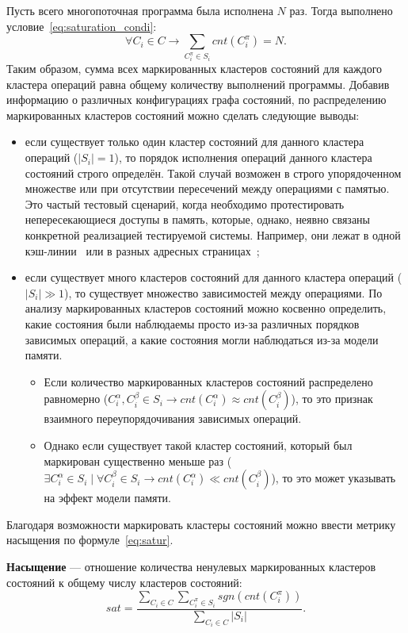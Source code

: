 Пусть всего многопоточная программа была исполнена $N$ раз. Тогда
выполнено условие~\ref{eq:saturation_condi}:
\begin{equation}
  \forall C_i \in C \rightarrow \sum_{C_i^\pi \in S_i}{cnt(C_i^\pi)} = N.
  \label{eq:saturation_condi}
\end{equation}
Таким образом, сумма всех маркированных кластеров состояний для
каждого кластера операций равна общему количеству выполнений
программы. Добавив информацию о различных конфигурациях графа
состояний, по распределению маркированных кластеров состояний можно
сделать следующие выводы:
\begin{itemize}
  \item если существует только один кластер состояний для данного
    кластера операций ($|S_i| = 1$), то порядок исполнения операций
    данного кластера состояний строго определён. Такой случай
    возможен в строго упорядоченном множестве или при отсутствии
    пересечений между операциями с памятью. Это частый тестовый
    сценарий, когда необходимо протестировать непересекающиеся
    доступы в память, которые, однако, неявно связаны конкретной
    реализацией тестируемой системы. Например, они лежат в одной
    кэш-линии~\cite{false-sharing} или в разных адресных
    страницах~\cite{page-table};
  \item если существует много кластеров состояний для данного
    кластера операций ($|S_i| \gg 1$), то существует множество
    зависимостей между операциями. По анализу маркированных кластеров
    состояний можно косвенно определить, какие состояния были
    наблюдаемы просто из-за различных порядков зависимых операций, а
    какие состояния могли наблюдаться из-за модели памяти.
    \begin{itemize}
      \item Если количество маркированных кластеров состояний
        распределено равномерно ($C_i^\alpha, C_i^\beta \in S_i
        \rightarrow cnt(C_i^\alpha) \approx cnt(C_i^\beta)$), то это
        признак взаимного переупорядочивания зависимых операций.
      \item Однако если существует такой кластер состояний, который
        был маркирован существенно меньше раз ($\exists C_i^\alpha
          \in S_i \mid \forall C_i^\beta \in S_i \rightarrow
        cnt(C_i^\alpha) \ll cnt(C_i^\beta)$), то это может указывать
        на эффект модели памяти.
    \end{itemize}
\end{itemize}

Благодаря возможности маркировать кластеры состояний можно ввести
метрику насыщения по формуле~\ref{eq:satur}.
\begin{definition}
  \textbf{Насыщение} — отношение количества ненулевых маркированных
  кластеров состояний к общему числу кластеров состояний:
  \begin{equation}
    sat = \frac
    {\sum\limits_{C_i \in C}{\sum\limits_{C_i^\pi \in S_i}{sgn(cnt(C_i^\pi))}}}
    {\sum\limits_{C_i \in C}{|S_i|}}.
    \label{eq:satur}
  \end{equation}
\end{definition}

